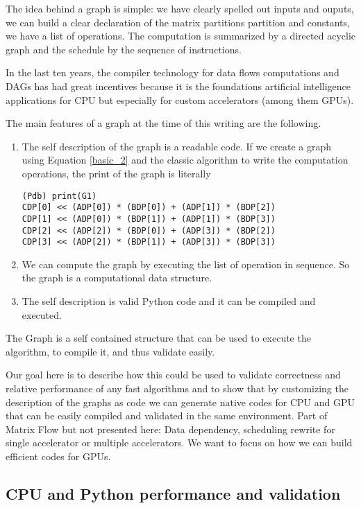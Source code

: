 \documentclass[acmsmall]{acmart}
\begin{document}
The idea behind a graph is simple: we have clearly spelled out inputs
and ouputs, we can build a clear declaration of the matrix partitions
partition and constants, we have a list of operations. The computation
is summarized by a directed acyclic graph and the schedule by the
sequence of instructions.

In the last ten years, the compiler technology for data flows
computations and DAGs has had great incentives because it is the
foundations artificial intelligence applications for CPU but
especially for custom accelerators (among them GPUs).

The main features of a graph at the time of this writing are the
following.
\begin{enumerate} 
\item The self description of the graph is a readable code. If we
  create a graph using Equation \ref{basic_2} and the classic
  algorithm to write the computation operations, the print of the
  graph is literally
\begin{verbatim}
(Pdb) print(G1)
CDP[0] << (ADP[0]) * (BDP[0]) + (ADP[1]) * (BDP[2])
CDP[1] << (ADP[0]) * (BDP[1]) + (ADP[1]) * (BDP[3])
CDP[2] << (ADP[2]) * (BDP[0]) + (ADP[3]) * (BDP[2])
CDP[3] << (ADP[2]) * (BDP[1]) + (ADP[3]) * (BDP[3])
\end{verbatim}

\item We can compute the graph by executing the list of operation in
  sequence. So the graph is a computational data structure.

\item The self description is valid Python code and it can be compiled
  and executed.
\end{enumerate}

The Graph is a self contained structure that can be used to execute
the algorithm, to compile it, and thus validate easily.

Our goal here is to describe how this could be used to validate
correctness and relative performance of any fast algorithms and to
show that by customizing the description of the graphs as code we can
generate native codes for CPU and GPU that can be easily compiled and
validated in the same environment. Part of Matrix Flow but not
presented here: Data dependency, scheduling rewrite for single
accelerator or multiple accelerators. We want to focus on how we can
build efficient codes for GPUs.

\subsection{CPU and Python performance and validation}
\end{document}

